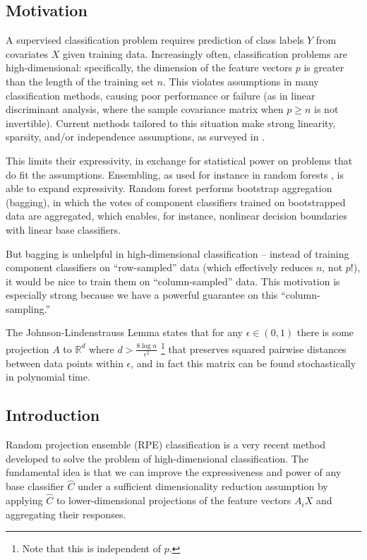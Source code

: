 \documentclass[ejs,preprint]{imsart}
\begin{document}
\subsection{Motivation}

A supervised classification problem requires prediction of class labels $Y$ from covariates $X$ given training data. Increasingly often, classification problems are high-dimensional: specifically, the dimension of the feature vectors $p$ is greater than the length of the training set $n$. This violates assumptions in many classification methods, causing poor performance or failure (as in linear discriminant analysis, where the sample covariance matrix when $p\geq n$ is not invertible). Current methods tailored to this situation make strong linearity, sparsity, and/or independence assumptions, as surveyed in \cite{CS15}.

This limits their expressivity, in exchange for statistical power on problems that do fit the assumptions. Ensembling, as used for instance in random forests \cite{Breiman01}, is able to expand expressivity. Random forest performs bootstrap aggregation (bagging), in which the votes of component classifiers trained on bootstrapped data are aggregated, which enables, for instance, nonlinear decision boundaries with linear base classifiers.

But bagging is unhelpful in high-dimensional classification -- instead of training component classifiers on ``row-sampled'' data (which effectively reduces $n$, not $p$!), it would be nice to train them on ``column-sampled'' data. This motivation is especially strong because we have a powerful guarantee on this ``column-sampling.''

The Johnson-Lindenstrauss Lemma \cite{DG03} states that for any $\epsilon\in(0,1)$ there is some projection $A$ to $\mathbb R^d$ where $d>\frac{8\log n}{\epsilon^2}$ \footnote{Note that this is independent of $p$.} that preserves squared pairwise distances between data points within $\epsilon$, and in fact this matrix can be found stochastically in polynomial time.


\subsection{Introduction}

Random projection ensemble (RPE) classification is a very recent method developed to solve the problem of high-dimensional classification.
The fundamental idea is that we can improve the expressiveness and power of any base classifier $\hat C$ under a sufficient dimensionality reduction assumption by applying $\hat C$ to lower-dimensional projections of the feature vectors $A_i X$ and aggregating their responses.
\end{document}
